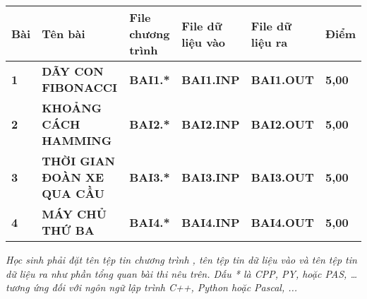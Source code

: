 \documentclass[
]{article}
\begin{document}
\begin{longtable}[]{@{}
  >{\centering\arraybackslash}p{}
  >{\raggedright\arraybackslash}p{}
  >{\centering\arraybackslash}p{}
  >{\centering\arraybackslash}p{}
  >{\centering\arraybackslash}p{}
  >{\centering\arraybackslash}p{}@{}}
\toprule\noalign{}
\begin{minipage}[b]{\linewidth}\centering
\textbf{Bài}
\end{minipage} & \begin{minipage}[b]{\linewidth}\centering
\textbf{Tên bài}
\end{minipage} & \begin{minipage}[b]{\linewidth}\centering
\textbf{File chương trình}
\end{minipage} & \begin{minipage}[b]{\linewidth}\centering
\textbf{File dữ liệu vào}
\end{minipage} & \begin{minipage}[b]{\linewidth}\centering
\textbf{File dữ liệu ra}
\end{minipage} & \begin{minipage}[b]{\linewidth}\centering
\textbf{Điểm}
\end{minipage} \\
\midrule\noalign{}
\endhead
\bottomrule\noalign{}
\endlastfoot
\textbf{1} & \textbf{DÃY CON FIBONACCI} & \textbf{BAI1.*} &
\textbf{BAI1.INP} & \textbf{BAI1.OUT} & \textbf{5,00} \\
\textbf{2} & \textbf{KHOẢNG CÁCH HAMMING} & \textbf{BAI2.*} &
\textbf{BAI2.INP} & \textbf{BAI2.OUT} & \textbf{5,00} \\
\textbf{3} & \textbf{THỜI GIAN ĐOÀN XE QUA CẦU} & \textbf{BAI3.*} &
\textbf{BAI3.INP} & \textbf{BAI3.OUT} & \textbf{5,00} \\
\textbf{4} & \textbf{MÁY CHỦ THỨ BA} & \textbf{BAI4.*} &
\textbf{BAI4.INP} & \textbf{BAI4.OUT} & \textbf{5,00} \\
\end{longtable}

\emph{Học sinh phải đặt tên tệp tin chương trình , tên tệp tin dữ liệu
vào và tên tệp tin dữ liệu ra như phần tổng quan bài thi nêu trên. Dấu *
là CPP, PY, hoặc PAS, \ldots{} tương ứng đối với ngôn ngữ lập trình C++,
Python hoặc Pascal, ...}
\end{document}
